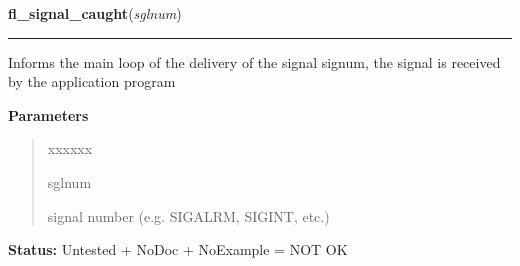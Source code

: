 \hspace{.8\funcindent}\begin{boxedminipage}{\funcwidth}

    \raggedright \textbf{fl\_signal\_caught}(\textit{sglnum})

    \vspace{-1.5ex}

    \rule{\textwidth}{0.5\fboxrule}
\setlength{\parskip}{2ex}
    Informs the main loop of the delivery of the signal signum, the signal 
    is received by the application program

\setlength{\parskip}{1ex}
      \textbf{Parameters}
      \vspace{-1ex}

      \begin{quote}
        \begin{Ventry}{xxxxxx}

          \item[sglnum]

          signal number (e.g. SIGALRM, SIGINT, etc.)

        \end{Ventry}

      \end{quote}

\textbf{Status:} Untested + NoDoc + NoExample = NOT OK



    \end{boxedminipage}

    \label{xformslib:library:fl_app_signal_direct}

    \vspace{0.5ex}


